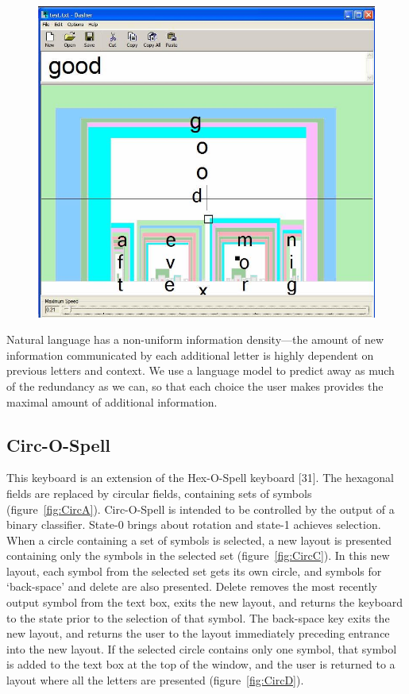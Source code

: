 \documentclass[12pt,titlepage]{article}
\begin{document}
\begin{figure}[t]
\begin{center}
	\includegraphics[scale=0.25]{figure4.jpeg}
	\label{fig:Dash}
\end{center}
\end{figure}

Natural language has a non-uniform information density---the amount of new information 
communicated by each additional letter is highly dependent on previous letters and context. 
We use a language model to predict away as much of the redundancy as we can, so that each 
choice the user makes provides the maximal amount of additional information.

\subsection{Circ-O-Spell}

This keyboard is an extension of the Hex-O-Spell keyboard [31].  The hexagonal fields are replaced by 
circular fields, containing sets of symbols (figure~\ref{fig:CircA}).  Circ-O-Spell is intended to be controlled by the 
output of a binary classifier.  State-0 brings about rotation and state-1 achieves selection.  When a circle 
containing a set of symbols is selected, a new layout is presented containing only the symbols in the 
selected set (figure~\ref{fig:CircC}).  In this new layout, each symbol from the selected set gets its own circle, and 
symbols for `back-space' and delete are also presented.  Delete removes the most recently output 
symbol from the text box, exits the new layout, and returns the keyboard to the state prior to the 
selection of that symbol.  The back-space key exits the new layout, and returns the user to the layout 
immediately preceding entrance into the new layout.  If the selected circle contains only one symbol, 
that symbol is added to the text box at the top of the window, and the user is returned to a layout where 
all the letters are presented (figure~\ref{fig:CircD}).
\end{document}
